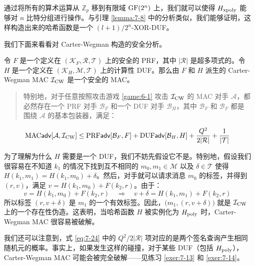 \begin{remark}\label{remark:7-4}
通过将所有的算术运算从 $\mathbb{Z}_p$ 移到有限域 ${\rm GF}(2^n)$ 上，我们就可以使得 $H_{\rm xpoly}$ 能够对 $n$ 比特分组进行操作。与引理 \ref{lemma:7-8} 中的分析类似，我们能够证明，这样构造出来的哈希函数是一个 ${(l+1)}/{2^n}$-XOR-DUF。
\end{remark}

我们下面来看看对 Carter-Wegman 构造的安全分析。

\begin{theorem}\label{theo:7-9}
令 $F$ 是一个定义在 $(\mathcal{K}_F,\mathcal{R},\mathcal{T})$ 上的安全的 PRF，其中 $|\mathcal{R}|$ 是超多项式的。令 $H$ 是一个定义在 $(\mathcal{K}_H,\mathcal{M},\mathcal{T})$ 上的计算性 DUF。那么由 $F$ 和 $H$ 派生的 Carter-Wegman MAC $\mathcal{I}_{\rm CW}$ 是一个安全的 MAC。
\begin{quote}
特别地，对于任意按照攻击游戏 \ref{game:6-1} 攻击 $\mathcal{I}_{\rm CW}$ 的 MAC 对手 $\mathcal{A}$，都必然存在一个 PRF 对手 $\mathcal{B}_F$ 和一个 DUF 对手 $\mathcal{B}_H$，其中 $\mathcal{B}_F$ 和 $\mathcal{B}_F$ 都是围绕 $\mathcal{A}$ 的基本包装器，满足：
\end{quote}
\begin{equation}\label{eq:7-24}
{\rm MAC}\mathsf{adv}[\mathcal{A}, \mathcal{I}_{\rm CW}]\leq{\rm PRF}\mathsf{adv}[\mathcal{B}_F,F]+{\rm DUF}\mathsf{adv}[\mathcal{B}_H,H]+\frac{Q^2}{2|\mathcal{R}|}+\frac{1}{|\mathcal{T}|}
\end{equation}
\end{theorem}

\begin{remark}\label{remark:7-5}
为了理解为什么 $H$ 需要是一个 DUF，我们不妨先假设它不是。特别地，假设我们很容易在不知道 $k_1$ 的情况下找到互不相同的 $m_0,m_1\in\mathcal{M}$ 以及 $\delta\in\mathcal{T}$ 使得 $H(k_1,m_1)=H(k_1,m_0)+\delta$。然后，对手就可以请求消息 $m_0$ 的标签，并得到 $(r,v)$，满足 $v=H(k_1,m_0)+F(k_2,r)$。由于：
\[
v=H(k_1,m_0)+F(k_2,r)
\quad\Longrightarrow\quad
v+\delta=H(k_1,m_1)+F(k_2,r)
\]
所以标签 $(r,v+\delta)$ 是 $m_1$ 的一个有效标签。因此，$\big(m_1,(r,v+\delta)\big)$ 就是 $\mathcal{I}_{\rm CW}$ 上的一个存在性伪造。这表明，当哈希函数 $H$ 被实例化为 $H_{\rm poly}$ 时，Carter-Wegman MAC 很容易被破解。
\end{remark}

\begin{remark}\label{remark:7-6}
我们还可以注意到，式 \ref{eq:7-24} 中的 ${Q^2}/{2|\mathcal{R}|}$ 项对应的是两个签名查询产生相同随机元的概率。事实上，如果发生这样的碰撞，对于某些 DUF（包括 $H_{\rm poly}$），Carter-Wegman MAC 可能会被完全破解——见练习 \ref{exer:7-13} 和 \ref{exer:7-14}。
\end{remark}

